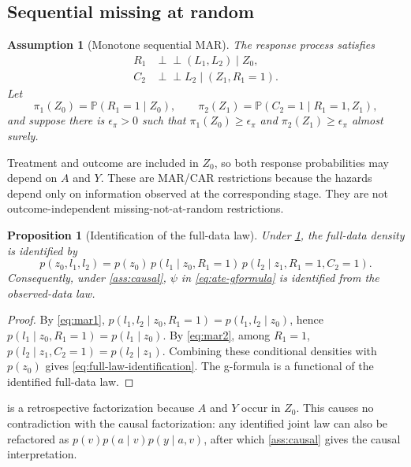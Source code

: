 \documentclass[11pt]{article}
\newtheorem{assumption}{Assumption}
\newtheorem{proposition}{Proposition}
\theoremstyle{definition}
\newcommand{\Pp}{\mathbb{P}}
\newcommand{\indep}{\perp\!\!\!\perp}
\newcommand{\1}{\mathbf{1}}
\begin{document}
\subsection{Sequential missing at random}

\begin{assumption}[Monotone sequential MAR]\label{ass:smar}
The response process satisfies
\begin{align}
R_1&\indep (L_1,L_2)\mid Z_0,\label{eq:mar1}\\
C_2&\indep L_2\mid (Z_1,R_1=1).\label{eq:mar2}
\end{align}
Let
\[
\pi_1(Z_0)=\Pp(R_1=1\mid Z_0),\qquad
\pi_2(Z_1)=\Pp(C_2=1\mid R_1=1,Z_1),
\]
and suppose there is $\epsilon_\pi>0$ such that $\pi_1(Z_0)\ge\epsilon_\pi$ and
$\pi_2(Z_1)\ge\epsilon_\pi$ almost surely.
\end{assumption}

Treatment and outcome are included in $Z_0$, so both response probabilities may depend on $A$ and $Y$. These are MAR/CAR restrictions because the hazards depend only on information observed at the corresponding stage. They are not outcome-independent missing-not-at-random restrictions.

\begin{proposition}[Identification of the full-data law]\label{prop:identification}
Under \cref{ass:smar}, the full-data density is identified by
\begin{equation}\label{eq:full-law-identification}
p(z_0,l_1,l_2)
=p(z_0)\,p(l_1\mid z_0,R_1=1)\,
p(l_2\mid z_1,R_1=1,C_2=1).
\end{equation}
Consequently, under \cref{ass:causal}, $\psi$ in \cref{eq:ate-gformula} is identified from the observed-data law.
\end{proposition}

\begin{proof}
By \cref{eq:mar1}, $p(l_1,l_2\mid z_0,R_1=1)=p(l_1,l_2\mid z_0)$, hence $p(l_1\mid z_0,R_1=1)=p(l_1\mid z_0)$. By \cref{eq:mar2}, among $R_1=1$, $p(l_2\mid z_1,C_2=1)=p(l_2\mid z_1)$. Combining these conditional densities with $p(z_0)$ gives \cref{eq:full-law-identification}. The g-formula is a functional of the identified full-data law.
\end{proof}

 is a retrospective factorization because $A$ and $Y$ occur in $Z_0$. This causes no contradiction with the causal factorization: any identified joint law can also be refactored as $p(v)p(a\mid v)p(y\mid a,v)$, after which \cref{ass:causal} gives the causal interpretation.
\end{document}
